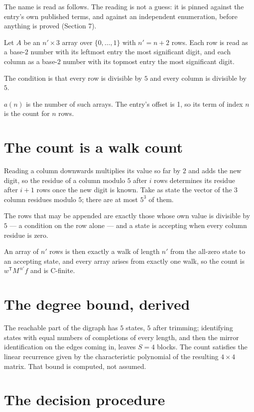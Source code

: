 \documentclass[11pt]{article}
\theoremstyle{definition}
\begin{document}
The name is read as follows. The reading is not a guess: it is pinned against the entry's own published terms, and against an independent enumeration, before anything is proved (Section 7).

Let $A$ be an $n' \times 3$ array over $\{0,\dots,1\}$ with $n' = n + 2$ rows. Each row is read as a base-$2$ number with its leftmost entry the most significant digit, and each column as a base-$2$ number with its topmost entry the most significant digit.

The condition is that every row is divisible by $5$ and every column is divisible by $5$.

$a(n)$ is the number of such arrays. The entry's offset is 1, so its term of index $n$ is the count for $n$ rows.

\section{The count is a walk count}

Reading a column downwards multiplies its value so far by $2$ and adds the new digit, so the residue of a column modulo $5$ after $i$ rows determines its residue after $i+1$ rows once the new digit is known. Take as state the vector of the $3$ column residues modulo $5$; there are at most $5^{3}$ of them.

The rows that may be appended are exactly those whose own value is divisible by $5$ --- a condition on the row alone --- and a state is accepting when every column residue is zero.

An array of $n'$ rows is then exactly a walk of length $n'$ from the all-zero state to an accepting state, and every array arises from exactly one walk, so the count is $w^{\mathsf T}M^{\,n'}f$ and is C-finite.

\section{The degree bound, derived}

The reachable part of the digraph has $5$ states, $5$ after trimming; identifying states with equal numbers of completions of every length, and then the mirror identification on the edges coming in, leaves $S = 4$ blocks. The count satisfies the linear recurrence given by the characteristic polynomial of the resulting $4\times4$ matrix. That bound is computed, not assumed.

\section{The decision procedure}
\end{document}
